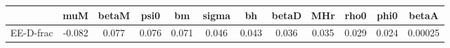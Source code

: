 \begin{tabular}{|c|c|c|c|c|c|c|c|c|c|c|c|}
\hline
& muM & betaM & psi0 & bm & sigma & bh & betaD & MHr & rho0 & phi0 & betaA \\
\hline
EE-D-frac & -0.082 & 0.077 & 0.076 & 0.071 & 0.046 & 0.043 & 0.036 & 0.035 & 0.029 & 0.024 & 0.00025 \\
\hline
\end{tabular}

